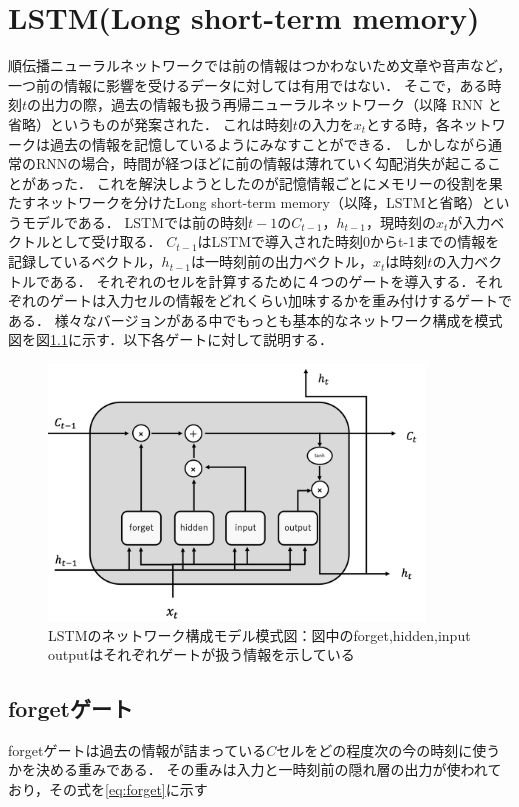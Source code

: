 \documentclass[a4j,11pt,report]{jsbook}
\begin{document}
\chapter{LSTM(Long short-term memory)\label{ch:LSTM}}
順伝播ニューラルネットワークでは前の情報はつかわないため文章や音声など，一つ前の情報に影響を受けるデータに対しては有用ではない．
そこで，ある時刻$t$の出力の際，過去の情報も扱う再帰ニューラルネットワーク（以降 RNN と省略）というものが発案された．
これは時刻$t$の入力を$x_{t}$とする時，各ネットワークは過去の情報を記憶しているようにみなすことができる．
しかしながら通常のRNNの場合，時間が経つほどに前の情報は薄れていく勾配消失が起こることがあった．
これを解決しようとしたのが記憶情報ごとにメモリーの役割を果たすネットワークを分けたLong short-term memory（以降，LSTMと省略）というモデルである．
LSTMでは前の時刻$t-1$の$C_{t-1}$，$h_{t-1}$，現時刻の$x_{t}$が入力ベクトルとして受け取る．
$C_{t-1}$はLSTMで導入された時刻0からt-1までの情報を記録しているベクトル，$h_{t-1}$は一時刻前の出力ベクトル，$x_{t}$は時刻$t$の入力ベクトルである．
それぞれのセルを計算するために４つのゲートを導入する．それぞれのゲートは入力セルの情報をどれくらい加味するかを重み付けするゲートである．
様々なバージョンがある中でもっとも基本的なネットワーク構成を模式図を図\ref{fig:LSTM_Simple}に示す．以下各ゲートに対して説明する．


\begin{figure}
  \centering
  \includegraphics[width = 100mm]{image/lstm_simple_image.png}
  \caption{LSTMのネットワーク構成モデル模式図：図中のforget,hidden,input outputはそれぞれゲートが扱う情報を示している }
  \label{fig:LSTM_Simple}
\end{figure}

\section{forgetゲート\label{sec:forget}}
forgetゲートは過去の情報が詰まっている$C$セルをどの程度次の今の時刻に使うかを決める重みである．
その重みは入力と一時刻前の隠れ層の出力が使われており，その式を\ref{eq:forget}に示す
\end{document}

